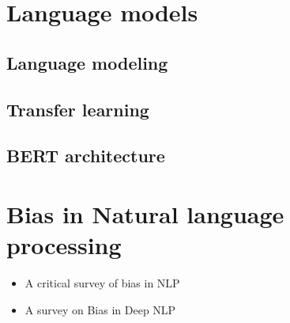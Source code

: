 \section{Language models}
\subsection{Language modeling}
\subsection{Transfer learning}
\subsection{BERT architecture}
\section{Bias in Natural language processing}
\begin{itemize}
    \item A critical survey of bias in NLP \cite{blodgett2020language}
    \item A survey on Bias in Deep NLP \cite{garrido2021survey}
\end{itemize}